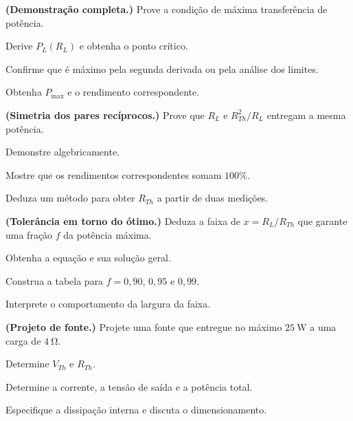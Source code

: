 \blocodesafio
\begin{questao}[4]{}

\textbf{(Demonstração completa.)} Prove a condição de máxima transferência de
potência.
\begin{itensq}
\item Derive $P_L(R_L)$ e obtenha o ponto crítico.
\item Confirme que é máximo pela segunda derivada ou pela análise dos limites.
\item Obtenha $P_{\max}$ e o rendimento correspondente.
\end{itensq}


\end{questao}
\begin{questao}[4]{}

\textbf{(Simetria dos pares recíprocos.)} Prove que $R_L$ e
$R_{Th}^{2}/R_L$ entregam a mesma potência.
\begin{itensq}
\item Demonstre algebricamente.
\item Mostre que os rendimentos correspondentes somam $100\%$.
\item Deduza um método para obter $R_{Th}$ a partir de duas medições.
\end{itensq}


\end{questao}
\begin{questao}[4]{}

\textbf{(Tolerância em torno do ótimo.)} Deduza a faixa de $x=R_L/R_{Th}$ que
garante uma fração $f$ da potência máxima.
\begin{itensq}
\item Obtenha a equação e sua solução geral.
\item Construa a tabela para $f=0{,}90$, $0{,}95$ e $0{,}99$.
\item Interprete o comportamento da largura da faixa.
\end{itensq}


\end{questao}
\begin{questao}[4]{}

\textbf{(Projeto de fonte.)} Projete uma fonte que entregue no máximo
$\SI{25}{\watt}$ a uma carga de $\SI{4}{\ohm}$.
\begin{itensq}
\item Determine $V_{Th}$ e $R_{Th}$.
\item Determine a corrente, a tensão de saída e a potência total.
\item Especifique a dissipação interna e discuta o dimensionamento.
\end{itensq}


\end{questao}
